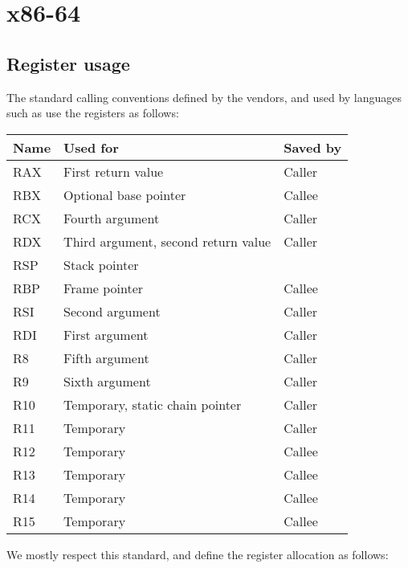 \chapter{x86-64}
\label{chapter-backend-x86-64}

\section{Register usage}
\label{sec-backend-x86-84-register-use}

The standard calling conventions defined by the vendors, and used by
languages such as \clanguage{} use the registers as follows:

\begin{tabular}{|l|l|l|}
\hline
Name & Used for & Saved by\\
\hline
\hline
RAX & First return value & Caller\\
RBX & Optional base pointer & Callee\\
RCX & Fourth argument & Caller \\
RDX & Third argument, second return value & Caller\\
RSP & Stack pointer &\\
RBP & Frame pointer & Callee\\
RSI & Second argument & Caller\\
RDI & First argument & Caller\\
R8 & Fifth argument & Caller\\
R9 & Sixth argument & Caller\\
R10 & Temporary, static chain pointer & Caller\\
R11 & Temporary & Caller\\
R12 & Temporary & Callee\\
R13 & Temporary & Callee\\
R14 & Temporary & Callee\\
R15 & Temporary & Callee\\
\hline
\end{tabular}

We mostly respect this standard, and define the register allocation as
follows:

